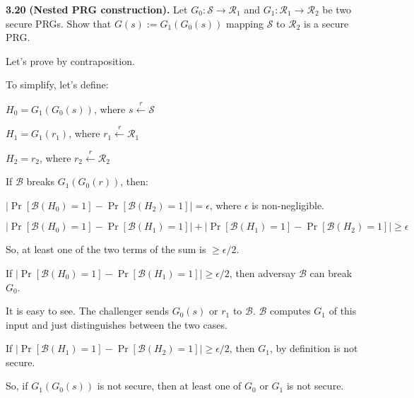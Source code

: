 \newpage
\noindent
\textbf{3.20}
\textbf{(Nested PRG construction).} Let $G_0 : \mathcal{S} \to \mathcal{R}_1$ and $G_1 : \mathcal{R}_1 \to \mathcal{R}_2$ be two secure PRGs.
Show that $G(s) := G_1 (G_0 (s))$ mapping $\mathcal{S}$ to $\mathcal{R}_2$ is a secure PRG.

\begin{tcolorbox}[solutionbox, title=Answer]

    Let's prove by contraposition.

    To simplify, let's define:

    $H_0 = G_1(G_0(s))$, where $s\stackrel{r}{\leftarrow}\mathcal{S}$

    $H_1 = G_1(r_1)$, where $r_1\stackrel{r}{\leftarrow}\mathcal{R}_1$

    $H_2 = r_2$, where $r_2\stackrel{r}{\leftarrow}\mathcal{R}_2$

    If $\mathcal{B}$ breaks $G_1(G_0(r))$, then:
    \vspace{1em}
    
    $|\Pr[\mathcal{B}(H_0) = 1] - \Pr[\mathcal{B}(H_2) = 1]| = \epsilon$, where $\epsilon$ is non-negligible.

    $|\Pr[\mathcal{B}(H_0) = 1] - \Pr[\mathcal{B}(H_1) = 1]| + |\Pr[\mathcal{B}(H_1) = 1] - \Pr[\mathcal{B}(H_2) = 1]| \ge \epsilon$

    So, at least one of the two terms of the sum is $\ge \epsilon/2$.
    \vspace{1em}

    If $|\Pr[\mathcal{B}(H_0) = 1] - \Pr[\mathcal{B}(H_1) = 1]| \ge \epsilon/2$, then adversay $\mathcal{B}$ can break $G_0$.

    It is easy to see. The challenger sends $G_0(s)$ or $r_1$ to $\mathcal{B}$. $\mathcal{B}$ computes $G_1$ of this input and just distinguishes between the two cases.
    \vspace{1em}

    If $|\Pr[\mathcal{B}(H_1) = 1] - \Pr[\mathcal{B}(H_2) = 1]| \ge \epsilon/2$, then $G_1$, by definition is not secure.

    So, if $G_1(G_0(s))$ is not secure, then at least one of $G_0$ or $G_1$ is not secure.

\end{tcolorbox}